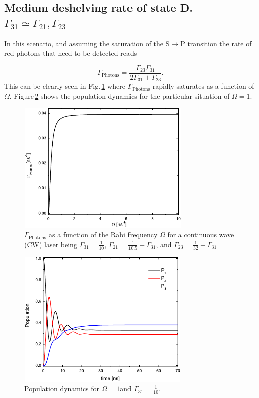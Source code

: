 \subsection{Medium deshelving rate of state D. $\Gamma_{31}\simeq\Gamma_{21}, \Gamma_{23}$}
In this scenario, and assuming the saturation of the S$\rightarrow$P transition the rate of red photons that need to be detected reads

\begin{equation}
\Gamma_{\text{Photons}}=\frac{\Gamma_{23}\Gamma_{31}}{2\Gamma_{31}+\Gamma_{23}}.
\end{equation}
This can be clearly seen in Fig.\,\ref{2DMedD} where $\Gamma_{\text{Photons}}$ rapidly saturates as a function of $\Omega$. Figure\,\ref{popuM} shows the population dynamics for the particular situation of $\Omega=1$\ns. 
\begin{figure}[ht!]
\begin{center}
\includegraphics[width=8.3cm, height=6.3cm]{imgs/2DMedD.pdf}
\caption{\label{2DMedD} $\Gamma_{\text{Photons}}$ as a function of the Rabi frequency $\Omega$ for a continuous wave (CW) laser being $\Gamma_{31}=\frac{1}{10}$\ns, $\Gamma_{21}=\frac{1}{10.5}+\Gamma_{31}$\ns, and $\Gamma_{23}=\frac{1}{32}+\Gamma_{31}$\ns}
\end{center}
\end{figure}


\begin{figure}[ht!]
\begin{center}
\includegraphics[width=8.3cm, height=6.6cm]{imgs/popuM.pdf}
\caption{\label{popuM} Population dynamics for $\Omega=1$\ns and  $\Gamma_{31}=\frac{1}{10}$\ns.}
\end{center}
\end{figure}

